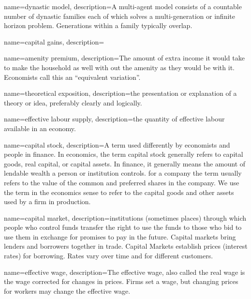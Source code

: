 


{
name=dynastic model,
description={A multi-agent model consists of a countable number of dynastic families each of which solves a multi-generation or infinite horizon problem. Generations within a family typically overlap. }
}

{
name=capital gains,
description={}
}

{
name=amenity premium,
description={The amount of extra income it would take to make the household as well with out the amenity as they would be with it. Economists call this an ``equivalent variation''.}
}

{
name=theoretical exposition,
description={the presentation or explanation of a theory or idea, preferably clearly and logically.}
}

{
name=effective labour supply,
description={the quantity of \gls{effective labour} available in an economy.}
}

{
name=capital stock,
description={A term used differently by economists and people in finance. In economics, the term capital stock generally refers to capital goods, real capital, or capital assets. In finance, it generally means the amount of lendable wealth a person or institution controls. for a company the term usually refers to the value of the common and preferred shares in the company. We use the term in the economics sense to refer to the capital goods and other assets used by a firm in production.}
}

{
name=capital market,
description={institutions (sometimes places) through which people who control funds transfer the right to use the funds to those who bid to use them in exchange for promises to pay in the future. Capital markets bring lenders and borrowers together in trade. Capital Markets establish prices (interest rates) for borrowing. Rates vary over time and for different customers.}
}

{
name=effective wage,
description={The effective wage, also called the real wage is the wage corrected for changes in prices. Firms set a wage, but changing prices for workers may change the effective wage.}
}

